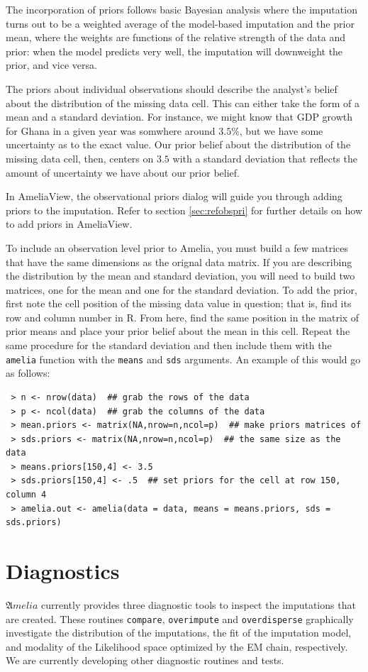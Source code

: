 \documentclass[12pt,titlepage]{article}
\newcommand{\Amelia}{\ensuremath{\mathfrak Amelia} }
\begin{document}
The incorporation of priors follows basic Bayesian analysis where the 
imputation turns out to be a weighted average of the model-based 
imputation and the prior mean, where the weights are functions of the 
relative strength of the data and prior: when the model predicts very 
well, the imputation will downweight the prior, and vice versa.  

The priors about individual observations should describe the analyst's 
belief about the distribution of the missing data cell.  This can either 
take the form of a mean and a standard deviation.  For instance, we 
might know that GDP growth for Ghana in a given year was somwhere 
around $3.5\%$, but we have some uncertainty as to the exact value.   
Our prior belief about the distribution of the missing data cell, then, 
centers on $3.5$ with a standard deviation that reflects the amount of 
uncertainty we have about our prior belief. 

In AmeliaView, the observational priors dialog will guide you through 
adding priors to the imputation.  Refer to section \ref{sec:refobspri} for 
further details on how to add priors in AmeliaView.

To include an observation level prior to Amelia, you must build a few
matrices that have the same dimensions as the orignal data matrix.  
If you are describing the distribution by the mean and standard deviation,
you will need to build two matrices, one for the mean and one for the 
standard deviation.  To add the prior, first note the cell position of the
missing data value in question; that is, find its row and column number in
R.  From here, find the same position in the matrix of prior means and 
place your prior belief about the mean in this cell.  Repeat the same 
procedure for the standard deviation and then include them with the 
\texttt{amelia} function with the \texttt{means} and \texttt{sds} 
arguments.  An example of this would go as follows:

\begin{verbatim}
 > n <- nrow(data)  ## grab the rows of the data
 > p <- ncol(data)  ## grab the columns of the data
 > mean.priors <- matrix(NA,nrow=n,ncol=p)  ## make priors matrices of
 > sds.priors <- matrix(NA,nrow=n,ncol=p)  ## the same size as the data
 > means.priors[150,4] <- 3.5
 > sds.priors[150,4] <- .5  ## set priors for the cell at row 150, column 4
 > amelia.out <- amelia(data = data, means = means.priors, sds = sds.priors)
\end{verbatim}


\section{Diagnostics}
\label{sec:diag}
\Amelia currently provides three diagnostic tools to inspect the
imputations that are created.  These routines \texttt{compare},
\texttt{overimpute} and \texttt{overdisperse} graphically investigate
the distribution of the imputations, the fit of the imputation model,
and modality of the Likelihood space optimized by the EM chain,
respectively.  We are currently developing other diagnostic routines
and tests.
\end{document}
